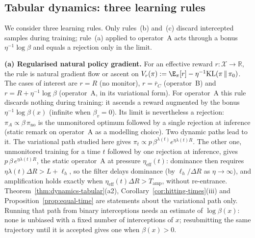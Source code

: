 \subsection{Tabular dynamics: three learning rules}

We consider three learning rules. Only rules~(b) and~(c) discard intercepted samples during training; rule~(a) applied to operator~A acts through a bonus $\eta^{-1}\log\beta$ and equals a rejection only in the limit.

\smallskip\noindent\textbf{(a) Regularised natural policy gradient.}
For an effective reward $r:\mathcal X\to\mathbb R$, the rule is natural
gradient flow or ascent on
$V_r(\pi):=\E_\pi[r]-\eta^{-1}\mathrm{KL}(\pi\,\|\,\pi_0)$. The cases of
interest are $r=R$ (no monitor), $r=\bar r_C$ (operator~B) and
$r=R+\eta^{-1}\log\beta$ (operator~A, in its variational form). For operator~A this rule discards nothing during training: it ascends a reward augmented by the bonus $\eta^{-1}\log\beta(x)$ (infinite when $\beta_v=0$). Its limit is nevertheless a rejection: $\pi_A\propto\beta\,\pi_{\mathrm{no}}$ is the unmonitored optimum followed by a single rejection at inference (static remark on operator~A as a modelling choice). Two dynamic paths lead to it. The variational path studied here gives $\pi_t\propto p\,\beta^{\lambda(t)}e^{\eta\lambda(t)R}$. The other one, unmonitored training for a time $t$ followed by one rejection at inference, gives $p\,\beta\,e^{\eta\lambda(t)R}$, the static operator~A at pressure $\eta_{\mathrm{eff}}(t)$: dominance then requires $\eta\lambda(t)\Delta R>L+\ell_h$, so the filter delays dominance (by $\ell_h/\Delta R$ as $\eta\to\infty$), and amplification holds exactly when $\eta_{\mathrm{eff}}(t)\Delta R>T_{\mathrm{amp}}$, without re-entrance. Theorem~\ref{thm:dynamics-tabular}(a2), Corollary~\ref{cor:hitting-times}(iii) and Proposition~\ref{prop:equal-time} are statements about the variational path only. Running that path from binary interceptions needs an estimate of $\log\beta(x)$: none is unbiased with a fixed number of interceptions of $x$; resubmitting the same trajectory until it is accepted gives one when $\beta(x)>0$.

